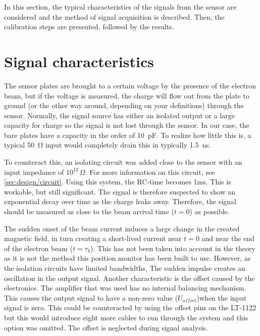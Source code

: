 In this section, the typical characteristics of the signals from the sensor are considered and the method of signal acquisition is described. Then, the calibration steps are presented, followed by the results.

\section{Signal characteristics}
\label{sec:calibration/signal}
The sensor plates are brought to a certain voltage by the presence of the electron beam, but if the voltage is measured, the charge will flow out from the plate to ground (or the other way around, depending on your definitions) through the sensor. Normally, the signal source has either an isolated output  or a large capacity for charge so the signal is not lost through the sensor. In our case, the bare plates have a capacity in the order of \SI{10}{\pico\farad}. To realize how little this is, a typical \SI{50}{\ohm} input would completely drain this in typically \SI{1.5}{\nano\second}.

To counteract this, an isolating circuit was added close to the sensor with an input impedance of $10^{12}\,\Omega$. For more information on this circuit, see \ref{sec:design/circuit}. Using this system, the RC-time becomes 1ms. This is workable, but still significant. The signal is therefore suspected to show an exponential decay over time as the charge leaks away. Therefore, the signal should be measured as close to the beam arrival time ($t=0$) as possible.

The sudden onset of the beam current induces a large change in the created magnetic field, in turn creating a short-lived current near $t=0$ and near the end of the electron beam ($t=\tau_b$). This has not been taken into account in the theory as it is not the method this position monitor has been built to use. However, as the isolation circuits have limited bandwidths, The sudden impulse creates an oscillation in the output signal.
Another characteristic is the offset caused by the electronics. The amplifier that was used has no internal balancing mechanism. This causes the output signal to have a non-zero value ($U_{offset}$)when the input signal is zero. This could be counteracted by using the offset pins on the LT-1122 \cite{LT1122} but this would introduce eight more cables to run through the system and this option was omitted. The offset is neglected during signal analysis.

